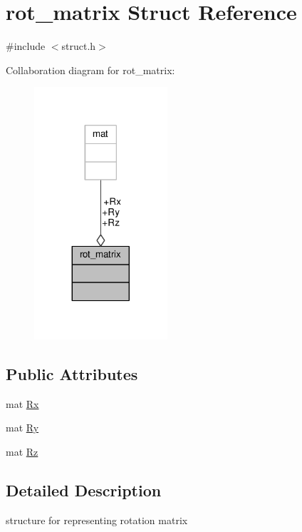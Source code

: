 \hypertarget{structrot__matrix}{}\section{rot\+\_\+matrix Struct Reference}
\label{structrot__matrix}


{\ttfamily \#include $<$struct.\+h$>$}



Collaboration diagram for rot\+\_\+matrix\+:
\nopagebreak
\begin{figure}[H]
\begin{center}
\leavevmode
\includegraphics[width=140pt]{structrot__matrix__coll__graph}
\end{center}
\end{figure}
\subsection*{Public Attributes}
\begin{DoxyCompactItemize}
\item 
mat \hyperlink{structrot__matrix_a4bdeed577feee6752729912f479eb3ca}{Rx}
\item 
mat \hyperlink{structrot__matrix_a595f20f5a41190dae97a4d982cc85b09}{Ry}
\item 
mat \hyperlink{structrot__matrix_a6205c56254ef39070a28c99d53e532ba}{Rz}
\end{DoxyCompactItemize}


\subsection{Detailed Description}
structure for representing rotation matrix 


